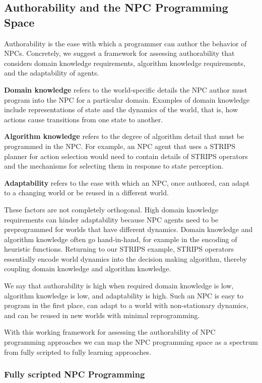 \subsection{Authorability and the NPC Programming Space}

Authorability is the ease with which a programmer can author the behavior of NPCs.  Concretely, we suggest a framework for assessing authorability that considers domain knowledge requirements, algorithm knowledge requirements, and the adaptability of agents.

{\bf Domain knowledge} refers to the world-specific details the NPC author must program into the NPC for a particular domain.  Examples of domain knowledge include representations of state and the dynamics of the world, that is, how actions cause transitions from one state to another.

{\bf Algorithm knowledge} refers to the degree of algorithm detail that must be programmed in the NPC.  For example, an NPC agent that uses a STRIPS planner for action selection would need to contain details of STRIPS operators and the mechanisms for selecting them in response to state perception.

{\bf Adaptability} refers to the ease with which an NPC, once authored, can adapt to a changing world or be reused in a different world.

These factors are not completely orthogonal.  High domain knowledge requirements can hinder adaptability because NPC agents need to be preprogrammed for worlds that have different dynamics.  Domain knowledge and algorithm knowledge often go hand-in-hand, for example in the encoding of heuristic functions.  Returning to our STRIPS example, STRIPS operators essentially encode world dynamics into the decision making algorithm, thereby coupling domain knowledge and algorithm knowledge.

We say that authorability is high when required domain knowledge is low, algorithm knowledge is low, and adaptability is high.  Such an NPC is easy to program in the first place, can adapt to a world with non-stationary dynamics, and can be reused in new worlds with minimal reprogramming.

With this working framework for assessing the authorability of NPC programming approaches we can map the NPC programming space as a spectrum from fully scripted to fully learning approaches.

\subsubsection{Fully scripted NPC Programming}

